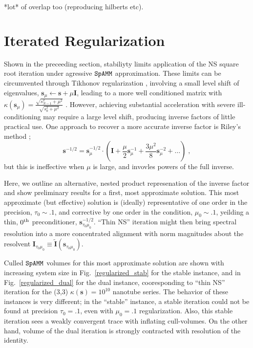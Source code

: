 \documentclass[letterpaper,twocolumn,amsmath,amsfont,amssymb,english,aps,jcp,preprintnumbers,groupaddress,nofootinbib,tightenlines,floatfix]{revtex4}
\newcommand{\mat}[1]{\boldsymbol{#1}}
\theoremstyle{plain}
\theoremstyle{remark}
\theoremstyle{plain}
\begin{document}
 *lot* of overlap too (reproducing hilberts etc).

\section{Iterated Regularization}

Shown in the preceeding section, stabiliyty limits application of the NS square root iteration under 
agressive $\tt SpAMM$ approximation.  These limits can be circumvented through Tikhonov regularization \cite{}, 
involving a small level shift of eigenvalues,  $\mat{s}_\mu \leftarrow \mat{s}+\mu \mat{I}$, leading to a more 
well conditioned matrix with $\kappa( \mat{s}_\mu) = \frac{\sqrt{s^2_{N-1} + \mu^2}}{\sqrt{s^2_0+\mu^2}}$ \cite{}.  
However, achieving substantial acceleration with severe ill-conditioning  may require a large level shift, 
producing inverse factors of little practical use.  One approach to recover a more accurate inverse
factor is Riley's method \cite{}; 
\begin{equation}
\mat{s}^{-1/2} = \mat{s}^{-1/2}_{\mu} \cdot \left( \mat{I}+\frac{\mu}{2} \mat{s}^{-1}_{\mu}
                                                   +\frac{3 \mu^2}{8} \mat{s}^{-2}_{\mu} + \dots
   \right) \; ,
\end{equation}
but this is ineffective when $\mu$ is large, and invovles powers of the full inverse. 

Here, we outline an alternative,  nested product represenation of the inverse factor and show preliminary 
results for a first, most approximate solution.  This most approximate (but effective) solution is (ideally) representative 
of one order in the precision, $\tau_0\sim .1$, and corrective by one order in the condition, $\mu_0\sim .1$,
yeilding a thin, $0^{\rm th}$ preconditioner, $\mat{s}^{-1/2}_{\tau_0 \mu_0}$.  ``Thin NS'' iteration might then bring 
spectral resolution into a more concentrated alignment with norm magnitudes about the resolvent 
$\mat{I}_{\tau_0\mu_0}\equiv \widetilde{\mat{I}}\left(\mat{s}_{\tau_0\mu_0}\right)$.  

Culled $\tt SpAMM$ volumes for this most approximate solution are shown with increasing system size in 
Fig.~\ref{regularized_stab} for the stable instance, and in Fig.~\ref{regularized_dual} for the dual instance, 
cooresponding to ``thin NS'' iteration for the (3,3) $\kappa(\mat{s})=10^{10}$ nanotube series.  
The behavior of these instances is very different; in the ``stable'' 
instance, a stable iteration could not be found at precision $\tau_0=.1$, even with $\mu_0=.1$ regularization.  Also, this stable iteration
sees a weakly convergent trace with inflating cull-volumes. On the other hand, volume of the dual iteration 
is strongly contracted with resolution of the identity.  
 
\end{document}
